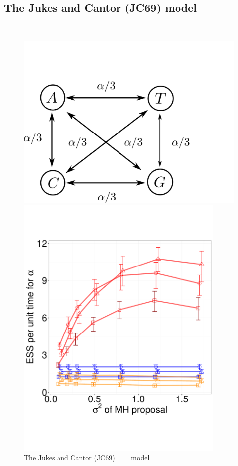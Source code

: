 {  \subsection{The Jukes and Cantor (JC69) model}~
  \begin{figure}%
  \centering
  \begin{minipage}[!hp]{0.48\linewidth}
  \centering
    \includegraphics [width=1.07\textwidth, angle=0]{figs/jc_model.pdf}
    \caption{The Jukes and Cantor (JC69)$\qquad$  model}
	\label{jc_model}
  \end{minipage}
  \begin{minipage}[!hp]{0.46\linewidth}
  \centering
    \includegraphics [width=0.9\textwidth, angle=0]{figs/jc.pdf}

\end{minipage}
\end{figure}}
